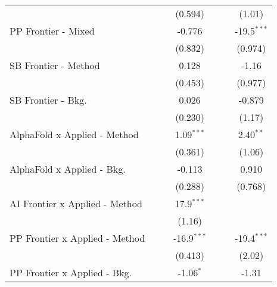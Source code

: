 \begin{tabular}{lcccccc}
                                  &                &               & (0.594)       &                &              & (1.01)\\   
   PP Frontier - Mixed            &                &               & -0.776        &                &              & -19.5$^{***}$\\   
                                  &                &               & (0.832)       &                &              & (0.974)\\   
   SB Frontier - Method           &                &               & 0.128         &                &              & -1.16\\   
                                  &                &               & (0.453)       &                &              & (0.977)\\   
   SB Frontier - Bkg.             &                &               & 0.026         &                &              & -0.879\\   
                                  &                &               & (0.230)       &                &              & (1.17)\\   
   AlphaFold x Applied - Method   &                &               & 1.09$^{***}$  &                &              & 2.40$^{**}$\\   
                                  &                &               & (0.361)       &                &              & (1.06)\\   
   AlphaFold x Applied - Bkg.     &                &               & -0.113        &                &              & 0.910\\   
                                  &                &               & (0.288)       &                &              & (0.768)\\   
   AI Frontier x Applied - Method &                &               & 17.9$^{***}$  &                &              &   \\   
                                  &                &               & (1.16)        &                &              &   \\   
   PP Frontier x Applied - Method &                &               & -16.9$^{***}$ &                &              & -19.4$^{***}$\\   
                                  &                &               & (0.413)       &                &              & (2.02)\\   
   PP Frontier x Applied - Bkg.   &                &               & -1.06$^{*}$   &                &              & -1.31\\   

\end{tabular}
